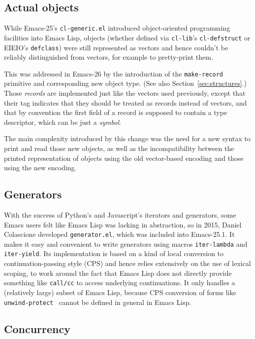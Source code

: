 \documentclass[format=acmsmall, review]{acmart}
\newcommand \Elisp {Emacs Lisp}
\begin{document}
\subsection{Actual objects}  %
\label{sec:actual-objects}

While Emacs-25's \texttt{cl-generic.el} introduced object-oriented
programming facilities into \Elisp{}, objects (whether defined via
\texttt{cl-lib}'s \texttt{cl-defstruct} or EIEIO's \texttt{defclass}) were
still represented as vectors and hence couldn't be reliably distinguished
from vectors, for example to pretty-print them.

This was addressed in Emacs-26 by the introduction of the
\texttt{make-record} primitive and corresponding new object type.
(See also Section~\ref{sec:structures}.)
Those \emph{records} are implemented just like the vectors used previously,
except that their tag indicates that they should be treated as records
instead of vectors, and that by convention the first field of a record is
supposed to contain a type descriptor, which can be just a \emph{symbol}.

The main complexity introduced by this change was the need for a new syntax
to print and read those new objects, as well as the incompatibility between
the printed representation of objects using the old vector-based encoding
and those using the new encoding.

\subsection{Generators}
\label{sec:generators}

With the success of Python's and Javascript's iterators and generators, some
Emacs users felt like \Elisp{} was lacking in abstraction, so in 2015,
Daniel Colascione developed \texttt{generator.el}, which was included
into Emacs-25.1.  It makes it easy and convenient to write generators using
macros \texttt{iter-lambda} and \texttt{iter-yield}.  Its implementation is
based on a kind of local conversion to continuation-passing style (CPS) and
hence relies extensively on the use of lexical scoping, to work around the
fact that \Elisp{} does not directly provide something like \texttt{call/cc}
to access underlying continuations.  It only handles a (relatively large)
subset of \Elisp{}, because CPS conversion of forms like
\texttt{unwind-protect}~\cite{HaynesFriedman1987} cannot be defined in general in \Elisp.

\subsection{Concurrency}
\label{sec:concurrency}
\end{document}
